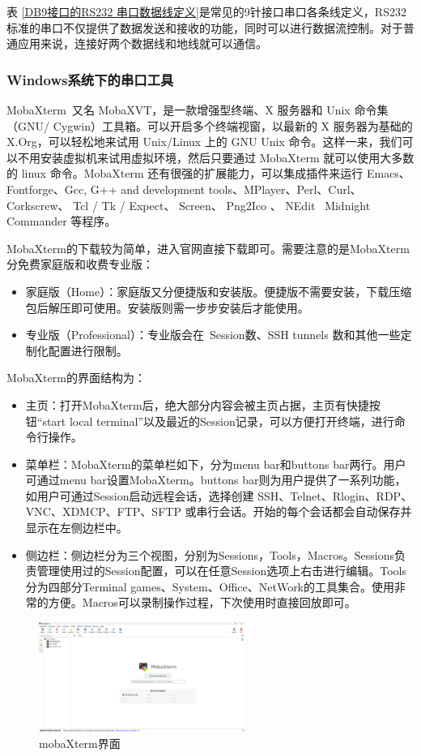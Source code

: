 表 \ref{DB9接口的RS232 串口数据线定义}是常见的9针接口串口各条线定义，RS232标准的串口不仅提供了数据发送和接收的功能，同时可以进行数据流控制。对于普通应用来说，连接好两个数据线和地线就可以通信。

\subsubsection{Windows系统下的串口工具}

MobaXterm 又名 MobaXVT，是一款增强型终端、X 服务器和 Unix 命令集（GNU/ Cygwin）工具箱。可以开启多个终端视窗，以最新的 X 服务器为基础的 X.Org，可以轻松地来试用 Unix/Linux 上的 GNU Unix 命令。这样一来，我们可以不用安装虚拟机来试用虚拟环境，然后只要通过 MobaXterm 就可以使用大多数的 linux 命令。MobaXterm 还有很强的扩展能力，可以集成插件来运行 Emacs、Fontforge、Gcc, G++ and development tools、MPlayer、Perl、Curl、Corkscrew、 Tcl / Tk / Expect、 Screen、 Png2Ico 、 NEdit  Midnight Commander 等程序。


MobaXterm的下载较为简单，进入官网直接下载即可。需要注意的是MobaXterm 分免费家庭版和收费专业版：
\begin{itemize}
	\item 家庭版（Home）：家庭版又分便捷版和安装版。便捷版不需要安装，下载压缩包后解压即可使用。安装版则需一步步安装后才能使用。
	\item 专业版（Professional）：专业版会在 Session数、SSH tunnels 数和其他一些定制化配置进行限制。
\end{itemize}

MobaXterm的界面结构为：
\begin{itemize}
	\item 主页：打开MobaXterm后，绝大部分内容会被主页占据，主页有快捷按钮“start local terminal”以及最近的Session记录，可以方便打开终端，进行命令行操作。
	\item 菜单栏：MobaXterm的菜单栏如下，分为menu bar和buttons bar两行。用户可通过menu bar设置MobaXterm。buttons bar则为用户提供了一系列功能，如用户可通过Session启动远程会话，选择创建 SSH、Telnet、Rlogin、RDP、VNC、XDMCP、FTP、SFTP 或串行会话。开始的每个会话都会自动保存并显示在左侧边栏中。
	\item 侧边栏：侧边栏分为三个视图，分别为Sessions，Tools，Macros。Sessions负责管理使用过的Session配置，可以在任意Session选项上右击进行编辑。Tools分为四部分Terminal games、System、Office、NetWork的工具集合。使用非常的方便。Macros可以录制操作过程，下次使用时直接回放即可。
\end{itemize}

\begin{figure}[h]
	\centering
	\includegraphics[width=0.6\textwidth]{figures/08-01-mobaXterm界面.png}
	\caption{mobaXterm界面}
	\label{mobaXterm界面}
\end{figure}


